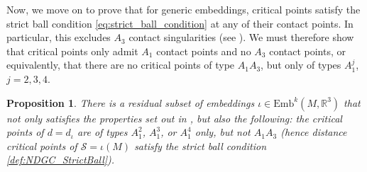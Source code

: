 \documentclass[11pt]{article}
\newcommand{\R}{\mathbb{R}}
\newcommand{\Emb}{\mathrm{Emb}^k(M,\R^3)}
\newcommand{\Surf}{\mathcal{S}}
\theoremstyle{plain}
\newtheorem{prop}{Proposition}
\theoremstyle{definition}
\theoremstyle{remark}
\begin{document}
	
	Now, we move on to prove that for generic embeddings, critical points satisfy the strict ball condition \eqref{eq:strict_ball_condition} at any of their contact points. In particular, this excludes $A_3$ contact singularities (see \cite{cazals_differential_2005}). We must therefore show that critical points only admit $A_1$ contact points and no $A_3$ contact points, or equivalently, that there are no critical points of type $A_1 A_3$, but only of types $A_1^j$, $j = 2,3,4$.
	
	\begin{prop}
		\label{prop:no_A_1_A_3}
		There is a residual subset of embeddings $\iota \in \Emb$ that not only satisfies the properties set out in , but also the following: the critical points of $d = d_\iota$ are of types $A_1^2$, $A_1^3$, or $A_1^4$ only, \emph{but not} $A_1 A_3$ (hence distance critical points of $\Surf = \iota(M)$ satisfy the strict ball condition \ref{def:NDGC_StrictBall}). 
	\end{prop}
	
\end{document}
